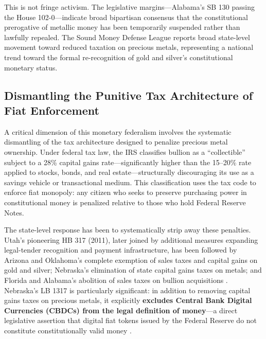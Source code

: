 \documentclass[
]{article}
\begin{document}
This is not fringe activism. The legislative margins---Alabama's SB 130
passing the House 102-0---indicate broad bipartisan consensus that the
constitutional prerogative of metallic money has been temporarily
suspended rather than lawfully repealed. The Sound Money Defense League
reports broad state-level movement toward reduced taxation on precious
metals, representing a national trend toward the formal re-recognition
of gold and silver's constitutional monetary status.

\subsection{Dismantling the Punitive Tax Architecture of Fiat
Enforcement}\label{dismantling-the-punitive-tax-architecture-of-fiat-enforcement}

A critical dimension of this monetary federalism involves the systematic
dismantling of the tax architecture designed to penalize precious metal
ownership. Under federal tax law, the IRS classifies bullion as a
``collectible'' subject to a 28\% capital gains rate---significantly
higher than the 15--20\% rate applied to stocks, bonds, and real
estate---structurally discouraging its use as a savings vehicle or
transactional medium. This classification uses the tax code to enforce
fiat monopoly: any citizen who seeks to preserve purchasing power in
constitutional money is penalized relative to those who hold Federal
Reserve Notes.

The state-level response has been to systematically strip away these
penalties. Utah's pioneering HB 317 (2011), later joined by additional
measures expanding legal-tender recognition and payment infrastructure,
has been followed by Arizona and Oklahoma's complete exemption of sales
taxes and capital gains on gold and silver; Nebraska's elimination of
state capital gains taxes on metals; and Florida and Alabama's abolition
of sales taxes on bullion acquisitions
\citep{utah2011legal, florida2025legaltender, alabama2025legaltender, nebraska2024metals}.
Nebraska's LB 1317 is particularly significant: in addition to removing
capital gains taxes on precious metals, it explicitly \textbf{excludes
Central Bank Digital Currencies (CBDCs) from the legal definition of
money}---a direct legislative assertion that digital fiat tokens issued
by the Federal Reserve do not constitute constitutionally valid money
\citep{nebraska2024metals}.
\end{document}
